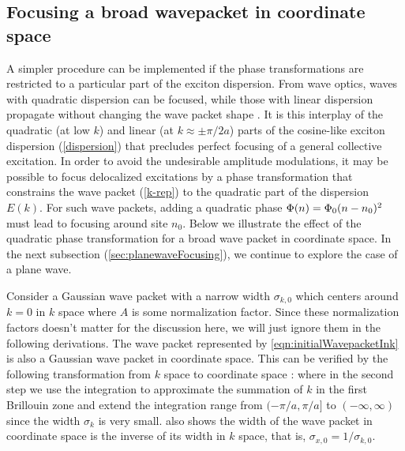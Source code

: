 \subsection{Focusing a broad wavepacket in coordinate space}
\label{sec:wavepacketFocusing}

A simpler procedure can be implemented if the phase transformations are restricted to a particular part of
the exciton dispersion.
From wave optics, waves with quadratic dispersion can be
focused, while those with linear dispersion propagate without changing
the wave packet shape \cite{focusing-books-1,focusing-books-2}. It is this interplay of the quadratic (at low $k$) and
 linear (at $k \approx \pm \pi/2a$) parts of the cosine-like exciton dispersion (\autoref{dispersion}) that precludes perfect  focusing of a general collective excitation.
In order to avoid the undesirable amplitude modulations, it may be possible to focus delocalized excitations by a phase transformation that
 constrains the wave packet (\ref{k-rep}) to the quadratic part of the dispersion $E(k)$.  For such wave packets, adding a quadratic phase
$\Phi(n) = \Phi_{0} (n-n_0)^2$ must lead to
focusing around site $n_0$. Below we illustrate the effect of the quadratic phase transformation for a broad wave packet in coordinate space. In the next subsection (\autoref{sec:planewaveFocusing}), we continue to explore the case of a plane wave. 



Consider a Gaussian wave packet with a narrow width $\sigma_{k, 0}$ which centers around $k=0$ in $k$ space
where $A$ is some normalization factor. Since these normalization factors doesn't matter for the discussion
 here, we will just ignore them in the following derivations. The wave packet represented by
 \autoref{eqn:initialWavepacketInk} is also a Gaussian wave packet in coordinate space. This can be verified
by the following transformation from $k$ space to coordinate space :
where in the second step we use the integration to approximate the summation of $k$ in the first Brillouin zone and 
extend the integration range from $(-\pi/a, \pi/a]$ to $(-\infty, \infty)$ since the width $\sigma_k$ is very small. 
 also shows the width of the wave packet in coordinate space is the 
inverse of its width in $k$ space, that is, $\sigma_{x, 0} = 1/\sigma_{k, 0}$. 

